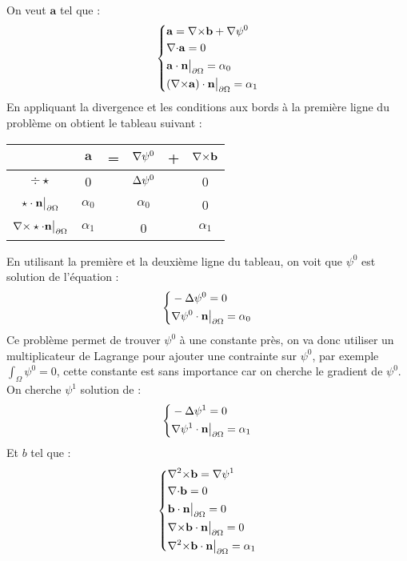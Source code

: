 On veut $\mathbf{a}$ tel que :
\begin{equation}\label{a}
\left\{\begin{aligned}
&\mathbf{a}={\nabla\times} \mathbf{b}+{\nabla}\psi^0\\
&{\nabla\cdot} \mathbf{a} =0\\
&\mathbf{a}\cdot \mathbf{n}{\big\rvert_{\partial\Omega}} = \alpha_0\\
&({\nabla\times} \mathbf{a})\cdot \mathbf{n}{\big\rvert_{\partial\Omega}} = \alpha_1
\end{aligned}\right.
\end{equation}
En appliquant la divergence et les conditions aux bords à la première ligne du problème on obtient le tableau suivant :
\begin{center}
\begin{tabular}{c|ccccc}
& $\mathbf{a}$ & = & ${\nabla}\psi^0$ & + & ${\nabla\times} \mathbf{b}$ \\ \hline
$\div\star$ & 0 & & ${\Delta}\psi^0$ & & 0\\ \hline
$\star\cdot \mathbf{n}{\big\rvert_{\partial\Omega}}$ & $\alpha_0$ & & $\alpha_0$ & & 0\\ \hline
${\nabla\times}\star\cdot \mathbf{n}{\big\rvert_{\partial\Omega}}$ & $\alpha_1$ & & 0 & & $\alpha_1$
\end{tabular}
\end{center}
En utilisant la première et la deuxième ligne du tableau, on voit que $\psi^0$ est solution de l'équation :
\begin{equation}\label{psi0}
\left\{\begin{aligned}
&-{\Delta}\psi^0 = 0\\
&{\nabla}\psi^0\cdot \mathbf{n}{\big\rvert_{\partial\Omega}}=\alpha_0
\end{aligned}\right.
\end{equation}
Ce problème permet de trouver $\psi^0$ à une constante près, on va donc utiliser un multiplicateur de Lagrange pour ajouter une contrainte sur $\psi^0$, par exemple $\int_\Omega \psi^0 = 0$, cette constante est sans importance car on cherche le gradient de $\psi^0$.\\

On cherche $\psi^1$ solution de :
\begin{equation}\label{psi1}
\left\{\begin{aligned}
&-{\Delta}\psi^1 = 0\\
&{\nabla}\psi^1\cdot \mathbf{n}{\big\rvert_{\partial\Omega}}=\alpha_1
\end{aligned}\right.
\end{equation}
Et $b$ tel que :
\begin{equation}\label{curlb}
\left\{\begin{aligned}
&{\nabla^2\times} \mathbf{b} = {\nabla}\psi^1\\
&{\nabla\cdot} \mathbf{b} = 0\\
&\mathbf{b}\cdot \mathbf{n}{\big\rvert_{\partial\Omega}} = 0\\
&{\nabla\times} \mathbf{b}\cdot \mathbf{n}{\big\rvert_{\partial\Omega}} = 0\\
&{\nabla^2\times} \mathbf{b}\cdot \mathbf{n}{\big\rvert_{\partial\Omega}} = \alpha_1
\end{aligned}\right.
\end{equation}

